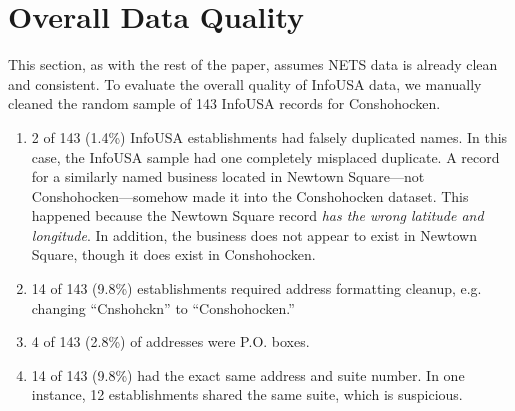 \documentclass[paper = letter, fontsize = 11pt]{scrartcl}
\begin{document}
\section{Overall Data Quality}
This section, as with the rest of the paper, assumes NETS data is already clean and consistent. To evaluate the overall quality of InfoUSA data, we manually cleaned the random sample of 143 InfoUSA records for Conshohocken.
\begin{enumerate}
	\item 2 of 143 (1.4\%) InfoUSA establishments had falsely duplicated names. In this case, the InfoUSA sample had one completely misplaced duplicate. A record for a similarly named business located in Newtown Square---not Conshohocken---somehow made it into the Conshohocken dataset. This happened because the Newtown Square record \textit{has the wrong latitude and longitude}. In addition, the business does not appear to exist in Newtown Square, though it does exist in Conshohocken.
	\item 14 of 143 (9.8\%) establishments required address formatting cleanup, e.g. changing ``Cnshohckn'' to ``Conshohocken.''
	\item 4 of 143 (2.8\%) of addresses were P.O. boxes.
	\item 14 of 143 (9.8\%) had the exact same address and suite number. In one instance, 12 establishments shared the same suite, which is suspicious.
\end{enumerate}
\end{document}
